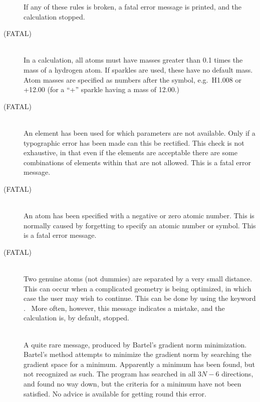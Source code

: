 \begin{description}
If any of these rules is broken, a fatal error message is  printed,
and the calculation stopped.
 
\item[\comp{ATOMIC MASS OF ATOM $nn$ TOO SMALL} (FATAL)]~\\
In a  calculation, all atoms must have masses greater than 0.1 times
the mass of a hydrogen atom.  If sparkles are used, these have no default mass.
Atom masses are specified as numbers after the symbol, e.g.\ H1.008 or +12.00 (for
a ``+'' sparkle having a mass of 12.00.)

\item[\comp{ATOMIC NUMBER $nn$ IS NOT AVAILABLE \ldots} (FATAL)]~\\
An element has been used for which parameters  are  not  available. Only  if  a
typographic error has been made can this be rectified.  This check is not
exhaustive, in that even if  the  elements  are  acceptable there  are  some 
combinations  of  elements within  that are not allowed.  This is a
fatal error message.


\item[\comp{ATOMIC NUMBER OF $nn$ ?}  (FATAL)]~\\
An atom has been specified with a negative or zero  atomic  number. This  is 
normally  caused  by forgetting to specify an atomic number or symbol.  This is
a fatal error message.

             
\item[\comp{ATOMS  $nn$ AND $nn$ ARE SEPARATED BY nn.nnnn ANGSTROMS}  (FATAL)]~\\
Two genuine atoms (not dummies)  are  separated  by  a  very  small
distance.    This  can  occur  when  a  complicated  geometry  is  being
optimized, in which case the user may wish to  continue.   This  can  be done 
by  using  the  keyword . \  More often, however, this message
indicates a mistake, and the calculation is, by default, stopped.

\item[\comp{ATTEMPT TO GO DOWNHILL IS UNSUCCESSFUL \ldots}]~\\
A  quite  rare  message,  produced  by   Bartel's gradient   norm minimization.  Bartel's method attempts to minimize the gradient
norm by searching the gradient space for a minimum.  Apparently  a  minimum 
has been found, but not recognized as such.  The program has searched in all
$3N-6$ directions, and found no way down, but the criteria for a minimum have 
not been satisfied.  No advice is available for getting round this error.



\end{description}
